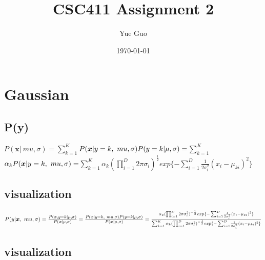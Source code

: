 \documentclass[letterpaper]{article}
\date{\today}
\title{CSC411 Assignment 2}
\author{Yue Guo}
\begin{document}
\maketitle


\section{Gaussian}

\subsection{P(y)}

$P( \bm{x} | \ mu ,  \sigma) = $$\sum_{k = 1}^{K}$$  P( \bm{x} | y = k, \ mu ,  \sigma) P(y = k | \mu, \sigma) \\
= $$  \sum_{k = 1}^{K}$$ \alpha_{k} P( \bm{x} | y = k, \ mu ,  \sigma) \\
= $$ \sum_{k = 1}^{K}$$ \alpha_{k} (\prod_{i=1}^{D} 2\pi \sigma_{i})^{\frac{1}{2}} exp\{{- \sum_{i=1}^{D}} \frac{1}{2 \sigma_{i} ^2} (x_{i} - \mu_{ki})^2 \}$

\subsection{visualization}

$P(y | \bm{x} , \ mu ,  \sigma) = \frac{P( \bm{x}, y = k | \mu ,  \sigma)}{P( \bm{x} |  \mu ,  \sigma)}
\\
= \frac{P( \bm{x} | y = k, \ mu ,  \sigma) P(y = k | \mu ,  \sigma)}{P( \bm{x} |  \mu ,  \sigma)}
\\
=\frac{ \alpha_{k} (\prod_{i=1}^{D} 2\pi \sigma_{i} ^{2})^{-\frac{1}{2}}  exp\{{- \sum_{i=1}^{D}} \frac{1}
{2 \sigma_{i} ^2} (x_{i} - \mu_{ki})^2 \}  }{\sum_{k=1}^{K} \alpha_{k} (\prod_{i=1}^{D} 2\pi \sigma_{i} ^{2})^{-\frac{1}{2}}  exp\{{- \sum_{i=1}^{D}} \frac{1}
{2 \sigma_{i} ^2} (x_{i} - \mu_{ki})^2 \}}$ \\
\subsection{visualization}
\end{document}
